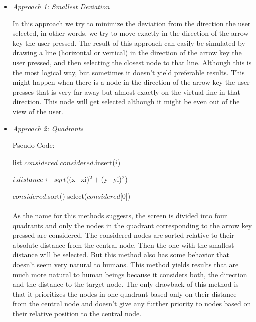 \begin{itemize} 
\item {\it Approach 1: Smallest Deviation}
\par \noindent
In this approach we try to minimize the deviation from the direction the user selected, in other words, we try to move exactly in the direction of the arrow key the user pressed. The result of this approach can easily be simulated by drawing a line (horizontal or vertical) in the direction of the arrow key the user pressed, and then selecting the closest node to that line. Although this is the most logical way, but sometimes it doesn't yield preferable results. This might happen when there is a node in the direction of the arrow key the user presses that is very far away but almost exactly on the virtual line in that direction. This node will get selected although it might be even out of the view of the user.

\item {\it Approach 2: Quadrants}
\par \noindent
Pseudo-Code:
\par
\begin{algorithmic}
\STATE list $considered$
		\STATE $considered$.insert($i$)
	\ENDIF
\ENDFOR

	\STATE $i.distance\gets sqrt(($x$-$xi$)^{\textnormal{2}}+($y$-$yi$)^{\textnormal{2}})$
\ENDFOR

\STATE $considered$.sort()
\STATE select($considered$[0])
\end{algorithmic}

\paragraph{}
As the name for this methods suggests, the screen is divided into four quadrants and only the nodes in the quadrant corresponding to the arrow key pressed are considered. The considered nodes are sorted relative to their absolute distance from the central node. Then the one with the smallest distance will be selected. But this method also has some behavior that doesn't seem very natural to humans. This method yields results that are much more natural to human beings because it considers both, the direction and the distance to the target node. The only drawback of this method is that it prioritizes the nodes in one quadrant based only on their distance from the central node and doesn't give any further priority to nodes based on their relative position to the central node.


\end{itemize}
